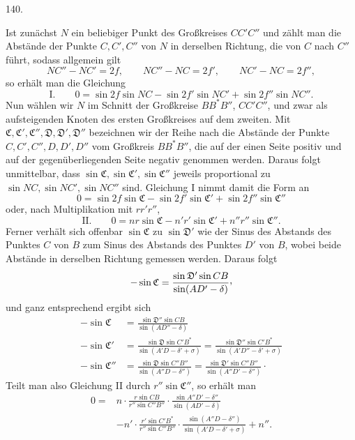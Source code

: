 \par{}\medskip
\begin{center}\hypertarget{native-187-article140}{}140.\end{center}
Ist zunächst $N$ ein beliebiger Punkt des Großkreises $CC'C''$ und zählt man die Abstände der Punkte $C,C',C''$ von $N$ in derselben Richtung, die von $C$ nach $C''$ führt, sodass allgemein gilt
\[
NC''-NC'=2f,\qquad NC''-NC=2f',\qquad NC'-NC=2f'',
\]
so erhält man die Gleichung
\[
\text{I.}\qquad 0=\sin2f\sin NC-\sin2f'\sin NC'+\sin2f''\sin NC''.
\]
Nun wählen wir $N$ im Schnitt der Großkreise $BB^*B''$, $CC'C''$, und zwar als aufsteigenden Knoten des ersten Großkreises auf dem zweiten. Mit $\mathfrak{C},\mathfrak{C}',\mathfrak{C}'',\mathfrak{D},\mathfrak{D}',\mathfrak{D}''$ bezeichnen wir der Reihe nach die Abstände der Punkte $C,C',C'',D,D',D''$ vom Großkreis $BB^*B''$, die auf der einen Seite positiv und auf der gegenüberliegenden Seite negativ genommen werden. Daraus folgt unmittelbar, dass $\sin\mathfrak{C},\sin\mathfrak{C}',\sin\mathfrak{C}''$ jeweils proportional zu $\sin NC,\sin NC',\sin NC''$ sind. Gleichung I nimmt damit die Form an
\[
0=\sin2f\sin\mathfrak{C}-\sin2f'\sin\mathfrak{C}'+\sin2f''\sin\mathfrak{C}''
\]
oder, nach Multiplikation mit $rr'r''$,
\hypertarget{native-188}{}
\[
\text{II.}\qquad 0=nr\sin\mathfrak{C}-n'r'\sin\mathfrak{C}'+n''r''\sin\mathfrak{C}''.
\]
Ferner verhält sich offenbar $\sin\mathfrak{C}$ zu $\sin\mathfrak{D}'$ wie der Sinus des Abstands des Punktes $C$ von $B$ zum Sinus des Abstands des Punktes $D'$ von $B$, wobei beide Abstände in derselben Richtung gemessen werden. Daraus folgt
\[
-\sin\mathfrak{C}=\frac{\sin\mathfrak{D}'\sin CB}{\sin(AD'-\delta)}\mathpunct{\raisebox{.45ex}{,}}
\]
und ganz entsprechend ergibt sich
\[
\begin{aligned}
-\sin\mathfrak{C}&=\frac{\sin\mathfrak{D}''\sin CB}{\sin(AD''-\delta)}\\[.8ex]
-\sin\mathfrak{C}'&=\frac{\sin\mathfrak{D}\sin C'B^*}{\sin(A'D-\delta'+\sigma)}
=\frac{\sin\mathfrak{D}''\sin C'B^*}{\sin(A'D''-\delta'+\sigma)}\\[.8ex]
-\sin\mathfrak{C}''&=\frac{\sin\mathfrak{D}\sin C''B''}{\sin(A''D-\delta'')}
=\frac{\sin\mathfrak{D}'\sin C''B''}{\sin(A''D'-\delta'')}\mathpunct{\cdot}
\end{aligned}
\]
Teilt man also Gleichung II durch $r''\sin\mathfrak{C}''$, so erhält man
\[
\begin{aligned}
0={}&n\cdot\frac{r\sin CB}{r''\sin C''B''}\cdot\frac{\sin A''D'-\delta''}{\sin(AD'-\delta)}\\[.8ex]
&-n'\cdot\frac{r'\sin C'B^*}{r''\sin C''B''}\cdot\frac{\sin(A''D-\delta'')}{\sin(A'D-\delta'+\sigma)}+n''.
\end{aligned}
\]
